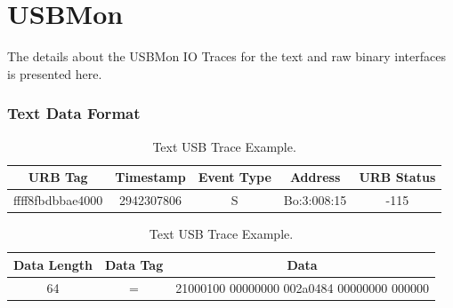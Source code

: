 \section{USBMon}
The details about the USBMon IO Traces for the text and raw binary interfaces is presented here.

\subsubsection{Text Data Format}
\begin{table}[h!]
\centering
\begin{tabular}{|c|c|c|c|c|}
\hline
URB Tag & Timestamp & Event Type & Address & URB Status\\
\hline
ffff8fbdbbae4000 & 2942307806 & S & Bo:3:008:15 & -115\\ 
\hline
\end{tabular}
\begin{tabular}{|c|c|c|}
\hline
Data Length & Data Tag & Data\\
\hline
64 & = & 21000100 00000000 002a0484 00000000 000000\\
\hline
\end{tabular}
\caption{Text USB Trace Example.}
\end{table}

